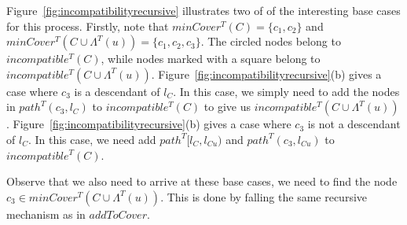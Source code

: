 \documentclass{article}
\newcommand{\leafset}{\Lambda}
\begin{document}
    Figure~\ref{fig:incompatibilityrecursive} illustrates two of of the interesting base cases for this process. Firstly, note that $minCover^{T}(C) = \{c_1, c_2\}$ and $minCover^{T}(C \cup \leafset^{T}(u)) = \{c_1, c_2, c_3\}$. The circled nodes belong to $incompatible^{T}(C)$, while nodes marked with a square belong to $incompatible^{T}(C \cup \leafset^{T}(u))$. Figure~\ref{fig:incompatibilityrecursive}(b) gives a case where $c_3$ is a descendant of $l_C$. In this case, we simply need to add the nodes in $path^{T}(c_3, l_C)$ to $incompatible^{T}(C)$ to give us $incompatible^{T}(C \cup \leafset^{T}(u))$. Figure~\ref{fig:incompatibilityrecursive}(b) gives a case where $c_3$ is not a descendant of $l_C$. In this case, we need add $path^{T}[l_C, l_{Cu})$ and $path^{T}(c_3, l_{Cu})$ to $incompatible^{T}(C)$.

    Observe that we also need to arrive at these base cases, we need to find the node $c_3 \in minCover^{T}(C \cup \leafset^{T}(u))$. This is done by falling the same recursive mechanism as in $addToCover$.
    \newline
\end{document}
